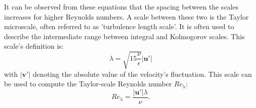 \documentclass[11pt,a4paper,openany,oneside,parskip=half*]{article}
\renewcommand*\vec[1]{\boldsymbol{#1}}
\begin{document}
It can be observed from these equations that the spacing between the scales increases for higher Reynolds numbers. 
\newline
A scale between these two is the Taylor microscale, often referred to as 'turbulence length scale'. 
It is often used to describe the intermediate range between integral and Kolmogorov scales. 
This scale's definition is: 
\begin{equation}
\lambda = \sqrt{15 \frac{\nu}{\epsilon}} |\vec{u'}|
\end{equation}
with $|\vec{v'}|$ denoting the absolute value of the velocity's fluctuation. This scale can be used to compute the Taylor-scale Reynolds number $Re_\mathrm{\lambda}$:
\begin{equation}
Re_\mathrm{\lambda} = \frac{|\vec{u'}| \lambda}{\nu}.
\end{equation}
\pagebreak
\end{document}
